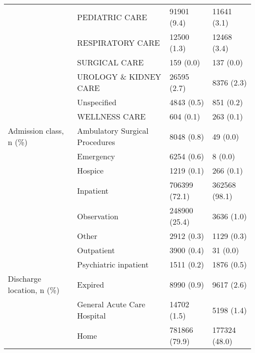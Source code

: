 \begin{tabular}{llll}
                                       & PEDIATRIC CARE &                           91901 (9.4) &       11641 (3.1) \\
                                       & RESPIRATORY CARE &                           12500 (1.3) &       12468 (3.4) \\
                                       & SURGICAL CARE &                             159 (0.0) &         137 (0.0) \\
                                       & UROLOGY \& KIDNEY CARE &                           26595 (2.7) &        8376 (2.3) \\
                                       & Unspecified &                            4843 (0.5) &         851 (0.2) \\
                                       & WELLNESS CARE &                             604 (0.1) &         263 (0.1) \\
Admission class, n (\%) & Ambulatory Surgical Procedures &                            8048 (0.8) &          49 (0.0) \\
                                       & Emergency &                            6254 (0.6) &           8 (0.0) \\
                                       & Hospice &                            1219 (0.1) &         266 (0.1) \\
                                       & Inpatient &                         706399 (72.1) &     362568 (98.1) \\
                                       & Observation &                         248900 (25.4) &        3636 (1.0) \\
                                       & Other &                            2912 (0.3) &        1129 (0.3) \\
                                       & Outpatient &                            3900 (0.4) &          31 (0.0) \\
                                       & Psychiatric inpatient &                            1511 (0.2) &        1876 (0.5) \\
Discharge location, n (\%) & Expired &                            8990 (0.9) &        9617 (2.6) \\
                                       & General Acute Care Hospital &                           14702 (1.5) &        5198 (1.4) \\
                                       & Home &                         781866 (79.9) &     177324 (48.0) \\

\end{tabular}

